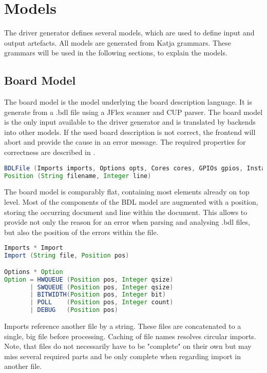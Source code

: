 \documentclass{report}
\begin{document}
\section{Models}
\label{sec:gen:models}
The driver generator defines several models, which are used to define input and output artefacts. All models are generated from Katja grammars. These grammars will be used in the following sections, to explain the models.

\subsection{Board Model}
The board model is the model underlying the board description language. It is generate from a .bdl file using a JFlex scanner and CUP parser. The board model is the only input available to the driver generator and is translated by backends into other models. If the used board description is not correct, the frontend will abort and provide the cause in an error message. The required properties for correctness are described in .

\begin{lstlisting}[language=java, breaklines=true]
BDLFile (Imports imports, Options opts, Cores cores, GPIOs gpios, Instances insts, Medium medium, Scheduler scheduler)
Position (String filename, Integer line)
\end{lstlisting}

The board model is comparably flat, containing most elements already on top level. Most of the components of the BDL model are augmented with a position, storing the occurring document and line within the document. This allows to provide not only the reason for an error when parsing and analysing .bdl files, but also the position of the errors within the file.

\begin{lstlisting}[language=java, breaklines=true]
Imports * Import
Import (String file, Position pos)

Options * Option
Option = HWQUEUE (Position pos, Integer qsize)
       | SWQUEUE (Position pos, Integer qsize)
       | BITWIDTH(Position pos, Integer bit)
       | POLL    (Position pos, Integer count)
       | DEBUG   (Position pos)
\end{lstlisting}

Imports reference another file by a string. These files are concatenated to a single, big file before processing. Caching of file names resolves circular imports. Note, that files do not necessarily have to be "complete" on their own but may miss several required parts and be only complete when regarding import in another file.
\end{document}
